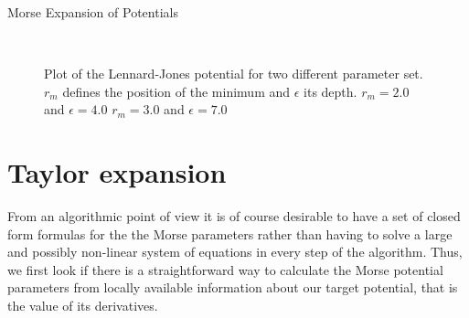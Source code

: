 \begin{chapter}{Morse Expansion of Potentials}
\begin{figure}[h!]
    \centering
    \\

       \caption[Lennard-Jones Potential]{Plot of the Lennard-Jones potential for two different
	   parameter set. $r_m$ defines the position of the minimum and $\epsilon$ its depth.
     $r_m=2.0$ and $\epsilon=4.0$
     $r_m=3.0$ and $\epsilon=7.0$
    \label{fig:LJPlots}
    }

\end{figure}



\section{Taylor expansion} %
\label{sec:Non-Grid based methods}
From an algorithmic point of view it is of course desirable to have a set of closed form formulas for the the Morse parameters rather than having
to solve a large and possibly non-linear system of equations in every step of the algorithm. Thus, we first look if there is a straightforward way to
calculate the Morse potential parameters from locally available information about our target potential, that is the value of its derivatives.


\end{chapter}
